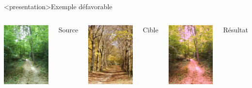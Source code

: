 \begin{frame}<presentation>{Exemple défavorable}
  \begin{columns}
    \column{4cm}
    \centering
    \includegraphics[width=4cm]{DSC00025}

    Source

    \column{4cm}
    \centering
    \includegraphics[width=4cm]{PB020097}

    Cible

    \column{4cm}
    \centering
    \includegraphics[width=4cm]{srcDSC00025tgtPB020097}

    Résultat
  \end{columns}
\end{frame}

